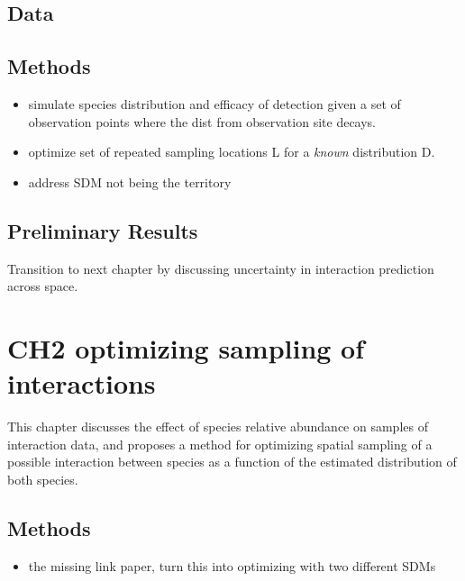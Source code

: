 \documentclass[10pt,oneside]{article}
\begin{document}
\hypertarget{data}{%
\subsection{Data}\label{data}}

\hypertarget{methods}{%
\subsection{Methods}\label{methods}}

\begin{itemize}
\tightlist
\item
  simulate species distribution and efficacy of detection given a set of
  observation points where the dist from observation site decays.
\item
  optimize set of repeated sampling locations L for a \emph{known}
  distribution D.
\item
  address SDM not being the territory
\end{itemize}

\hypertarget{preliminary-results}{%
\subsection{Preliminary Results}\label{preliminary-results}}

Transition to next chapter by discussing uncertainty in interaction
prediction across space.

\hypertarget{ch2-optimizing-sampling-of-interactions}{%
\section{CH2 optimizing sampling of
interactions}\label{ch2-optimizing-sampling-of-interactions}}

This chapter discusses the effect of species relative abundance on
samples of interaction data, and proposes a method for optimizing
spatial sampling of a possible interaction between species as a function
of the estimated distribution of both species.

\hypertarget{methods-1}{%
\subsection{Methods}\label{methods-1}}

\begin{itemize}
\tightlist
\item
  the missing link paper, turn this into optimizing with two different
  SDMs
\end{itemize}
\end{document}
